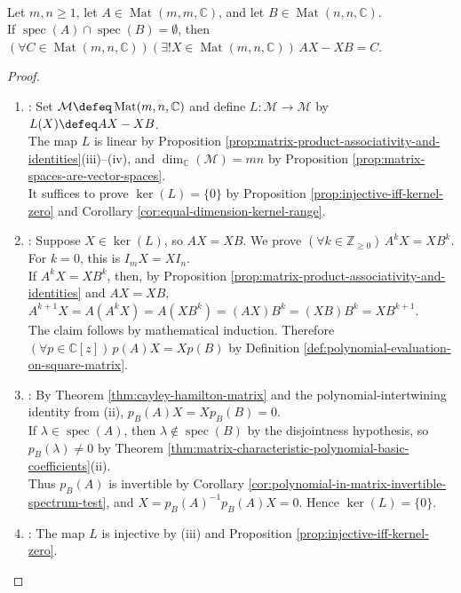 \begin{theorem} \label{thm:sylvester-linear-matrix-equation} \\
Let $m,n\geq1$, let $A\in\operatorname{Mat}(m,m,\mathbb{C})$, and let $B\in\operatorname{Mat}(n,n,\mathbb{C})$.\\
If $\operatorname{spec}(A)\cap\operatorname{spec}(B)=\emptyset$, then $(\forall C\in\operatorname{Mat}(m,n,\mathbb{C}))(\exists!X\in\operatorname{Mat}(m,n,\mathbb{C}))\,AX-XB=C$.
\begin{proof}
\begin{enumerate}[label=(\roman*)]
\setlength{\itemsep}{0pt}
\item {}: Set $\mathcal{M}\defeq\operatorname{Mat}(m,n,\mathbb{C})$ and define $L:\mathcal{M}\to\mathcal{M}$ by $L(X)\defeq AX-XB$.\\
The map $L$ is linear by Proposition \ref{prop:matrix-product-associativity-and-identities}(iii)--(iv), and $\dim_{\mathbb{C}}(\mathcal{M})=mn$ by Proposition \ref{prop:matrix-spaces-are-vector-spaces}.\\
It suffices to prove $\ker(L)=\{0\}$ by Proposition \ref{prop:injective-iff-kernel-zero} and Corollary \ref{cor:equal-dimension-kernel-range}.
\item {}: Suppose $X\in\ker(L)$, so $AX=XB$. We prove $(\forall k\in\mathbb{Z}_{\geq0})\,A^kX=XB^k$. For $k=0$, this is $I_mX=XI_n$.\\
If $A^kX=XB^k$, then, by Proposition \ref{prop:matrix-product-associativity-and-identities} and $AX=XB$, $A^{k+1}X=A(A^kX)=A(XB^k)=(AX)B^k=(XB)B^k=XB^{k+1}$.\\
The claim follows by mathematical induction. Therefore $(\forall p\in\mathbb{C}[z])\,p(A)X=Xp(B)$ by Definition \ref{def:polynomial-evaluation-on-square-matrix}.
\item {}: By Theorem \ref{thm:cayley-hamilton-matrix} and the polynomial-intertwining identity from (ii), $p_B(A)X=Xp_B(B)=0$.\\
If $\lambda\in\operatorname{spec}(A)$, then $\lambda\notin\operatorname{spec}(B)$ by the disjointness hypothesis, so $p_B(\lambda)\neq0$ by Theorem \ref{thm:matrix-characteristic-polynomial-basic-coefficients}(ii).\\
Thus $p_B(A)$ is invertible by Corollary \ref{cor:polynomial-in-matrix-invertible-spectrum-test}, and $X=p_B(A)^{-1}p_B(A)X=0$. Hence $\ker(L)=\{0\}$.
\item {}: The map $L$ is injective by (iii) and Proposition \ref{prop:injective-iff-kernel-zero}.\\

\end{enumerate}
\end{proof}
\end{theorem}
